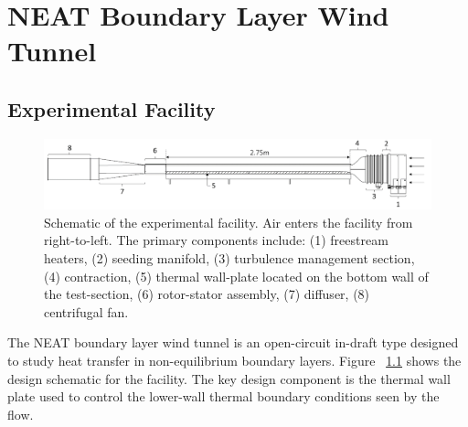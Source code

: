 \chapter{NEAT Boundary Layer Wind Tunnel}

\section{Experimental Facility}

\begin{figure}[h!]
\centering
\includegraphics[scale=.45]{figures/facility/tunnel_v7.png}
\caption{Schematic of the experimental facility. Air enters the facility from right-to-left. The primary components include: (1) freestream heaters, 
(2) seeding manifold, (3) turbulence management section, (4) contraction, (5) thermal wall-plate located on the bottom wall of the test-section, (6) rotor-stator assembly, (7) diffuser, (8) centrifugal fan.}
\label{fig:tunnel}
\end{figure}

The NEAT boundary layer wind tunnel is an open-circuit in-draft type designed to study heat transfer in non-equilibrium boundary layers. Figure ~\ref{fig:tunnel} shows the design schematic for the facility. The key design component is the thermal wall plate used to control the lower-wall thermal boundary conditions seen by the flow. 

